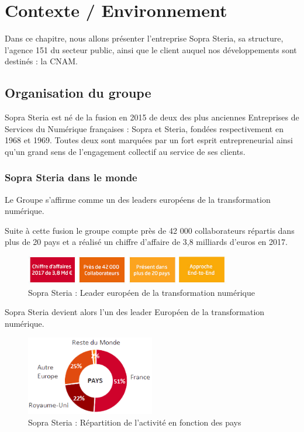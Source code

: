 \chapter{Contexte / Environnement}
\label{chap:premierchapitre}

Dans ce chapitre, nous allons présenter l'entreprise Sopra Steria, sa structure, l'agence 151 du secteur public, ainsi que le client auquel nos développements sont destinés : la CNAM.

\section{Organisation du groupe}

Sopra Steria est né de la fusion en 2015 de deux des plus anciennes Entreprises de Services du Numérique françaises : Sopra et Steria, fondées respectivement en 1968 et 1969. Toutes deux sont marquées par un fort esprit entrepreneurial ainsi qu'un grand sens de l’engagement collectif au service de ses clients.

\subsection{Sopra Steria dans le monde}

Le Groupe s'affirme comme un des leaders européens de la transformation numérique.

Suite à cette fusion le groupe compte près de 42 000 collaborateurs répartis dans plus de 20 pays et a réalisé un chiffre d’affaire de 3,8 milliards d’euros en 2017.

\begin{figure}[!h]
\centering
\includegraphics[width=0.8\textwidth]{images/chiffres_cles2017.jpg}
\caption{Sopra Steria : Leader européen de la transformation numérique}
\end{figure}

Sopra Steria devient alors l'un des leader Européen de la transformation numérique.

\begin{figure}[!h]
\centering
\includegraphics[width=0.5\textwidth]{images/payssoprasteria.png}
\caption{Sopra Steria : Répartition de l'activité en fonction des pays}
\end{figure}

